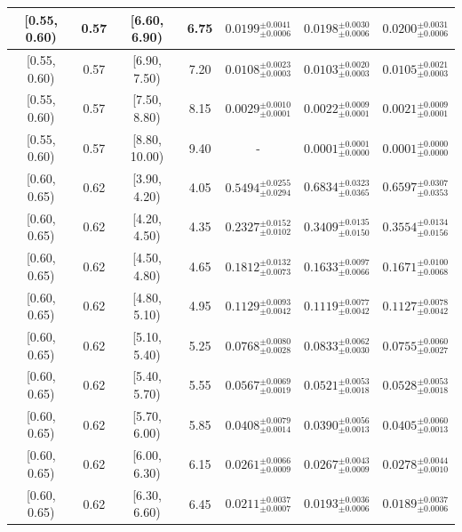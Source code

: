 \begin{longtable}{|c|c|c|c|c|c|c|}
\hline
[0.55, 0.60) & 0.57 & [6.60, 6.90) & 6.75 & $0.0199^{ \pm 0.0041 }_{ \pm 0.0006 }$ & $0.0198^{ \pm 0.0030 }_{ \pm 0.0006 }$ & $0.0200^{ \pm 0.0031 }_{ \pm 0.0006 }$ \\ 
\hline
[0.55, 0.60) & 0.57 & [6.90, 7.50) & 7.20 & $0.0108^{ \pm 0.0023 }_{ \pm 0.0003 }$ & $0.0103^{ \pm 0.0020 }_{ \pm 0.0003 }$ & $0.0105^{ \pm 0.0021 }_{ \pm 0.0003 }$ \\ 
\hline
[0.55, 0.60) & 0.57 & [7.50, 8.80) & 8.15 & $0.0029^{ \pm 0.0010 }_{ \pm 0.0001 }$ & $0.0022^{ \pm 0.0009 }_{ \pm 0.0001 }$ & $0.0021^{ \pm 0.0009 }_{ \pm 0.0001 }$ \\ 
\hline
[0.55, 0.60) & 0.57 & [8.80, 10.00) & 9.40 & - & $0.0001^{ \pm 0.0001 }_{ \pm 0.0000 }$ & $0.0001^{ \pm 0.0000 }_{ \pm 0.0000 }$ \\ 
\hline
[0.60, 0.65) & 0.62 & [3.90, 4.20) & 4.05 & $0.5494^{ \pm 0.0255 }_{ \pm 0.0294 }$ & $0.6834^{ \pm 0.0323 }_{ \pm 0.0365 }$ & $0.6597^{ \pm 0.0307 }_{ \pm 0.0353 }$ \\ 
\hline
[0.60, 0.65) & 0.62 & [4.20, 4.50) & 4.35 & $0.2327^{ \pm 0.0152 }_{ \pm 0.0102 }$ & $0.3409^{ \pm 0.0135 }_{ \pm 0.0150 }$ & $0.3554^{ \pm 0.0134 }_{ \pm 0.0156 }$ \\ 
\hline
[0.60, 0.65) & 0.62 & [4.50, 4.80) & 4.65 & $0.1812^{ \pm 0.0132 }_{ \pm 0.0073 }$ & $0.1633^{ \pm 0.0097 }_{ \pm 0.0066 }$ & $0.1671^{ \pm 0.0100 }_{ \pm 0.0068 }$ \\ 
\hline
[0.60, 0.65) & 0.62 & [4.80, 5.10) & 4.95 & $0.1129^{ \pm 0.0093 }_{ \pm 0.0042 }$ & $0.1119^{ \pm 0.0077 }_{ \pm 0.0042 }$ & $0.1127^{ \pm 0.0078 }_{ \pm 0.0042 }$ \\ 
\hline
[0.60, 0.65) & 0.62 & [5.10, 5.40) & 5.25 & $0.0768^{ \pm 0.0080 }_{ \pm 0.0028 }$ & $0.0833^{ \pm 0.0062 }_{ \pm 0.0030 }$ & $0.0755^{ \pm 0.0060 }_{ \pm 0.0027 }$ \\ 
\hline
[0.60, 0.65) & 0.62 & [5.40, 5.70) & 5.55 & $0.0567^{ \pm 0.0069 }_{ \pm 0.0019 }$ & $0.0521^{ \pm 0.0053 }_{ \pm 0.0018 }$ & $0.0528^{ \pm 0.0053 }_{ \pm 0.0018 }$ \\ 
\hline
[0.60, 0.65) & 0.62 & [5.70, 6.00) & 5.85 & $0.0408^{ \pm 0.0079 }_{ \pm 0.0014 }$ & $0.0390^{ \pm 0.0056 }_{ \pm 0.0013 }$ & $0.0405^{ \pm 0.0060 }_{ \pm 0.0013 }$ \\ 
\hline
[0.60, 0.65) & 0.62 & [6.00, 6.30) & 6.15 & $0.0261^{ \pm 0.0066 }_{ \pm 0.0009 }$ & $0.0267^{ \pm 0.0043 }_{ \pm 0.0009 }$ & $0.0278^{ \pm 0.0044 }_{ \pm 0.0010 }$ \\ 
\hline
[0.60, 0.65) & 0.62 & [6.30, 6.60) & 6.45 & $0.0211^{ \pm 0.0037 }_{ \pm 0.0007 }$ & $0.0193^{ \pm 0.0036 }_{ \pm 0.0006 }$ & $0.0189^{ \pm 0.0037 }_{ \pm 0.0006 }$ \\ 

\end{longtable}
